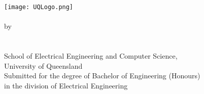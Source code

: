 \begin{titlepage}
	\begin{center}
		\texttt{[image: UQLogo.png]}\\
        \vfill
		\huge\textbf{\covertext}\\
        \vfill
		\large by\\
		\vspace{5mm}
		\Large\textbf{\authortext}\\
        \large \studentnotext \\
        \large {}
        \vfill
		\large School of Electrical Engineering and Computer Science,\\\smallskip
        \large University of Queensland\\
        \vfill
		\large Submitted for the degree of Bachelor of Engineering (Honours)\\\smallskip
        \large in the division of Electrical Engineering
        \vfill
		\large \thesisduedate
	\end{center}
\end{titlepage}